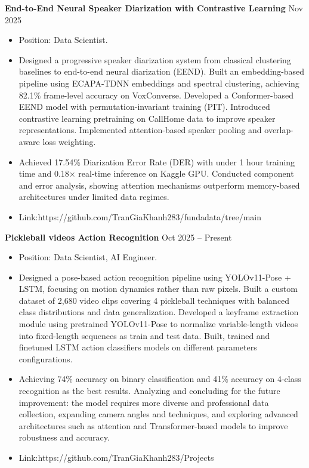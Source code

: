 \documentclass[11pt,a4paper]{article}
\begin{document}
\textbf{End-to-End Neural Speaker Diarization with Contrastive Learning} \hfill Nov 2025
\begin{itemize}[leftmargin=1.5em]
    \item Position: Data Scientist.
    \item Designed a progressive speaker diarization system from classical clustering baselines to end-to-end neural diarization (EEND). Built an embedding-based pipeline using ECAPA-TDNN embeddings and spectral clustering, achieving 82.1\% frame-level accuracy on VoxConverse. Developed a Conformer-based EEND model with permutation-invariant training (PIT). Introduced contrastive learning pretraining on CallHome data to improve speaker representations. Implemented attention-based speaker pooling and overlap-aware loss weighting.
    \item Achieved 17.54\% Diarization Error Rate (DER) with under 1 hour training time and 0.18× real-time inference on Kaggle GPU. Conducted component and error analysis, showing attention mechanisms outperform memory-based architectures under limited data regimes.
    \item Link:https://github.com/TranGiaKhanh283/fundadata/tree/main
\end{itemize}



\textbf{Pickleball videos Action Recognition} \hfill Oct 2025 -- Present
\begin{itemize}[leftmargin=1.5em]
    \item Position: Data Scientist, AI Engineer.
    \item Designed a pose-based action recognition pipeline using YOLOv11-Pose + LSTM, focusing on motion dynamics rather than raw pixels. Built a custom dataset of 2,680 video clips covering 4 pickleball techniques with balanced class distributions and data generalization. Developed a keyframe extraction module using pretrained YOLOv11-Pose to normalize variable-length videos into fixed-length sequences as train and test data. Built, trained and finetuned LSTM action classifiers models on different parameters configurations.
    \item Achieving 74\% accuracy on binary classification and 41\% accuracy on 4-class recognition as the best results. Analyzing and concluding for the future improvement: the model requires more diverse and professional data collection, expanding camera angles and techniques, and exploring advanced architectures such as attention and Transformer-based models to improve robustness and accuracy.
    \item Link:https://github.com/TranGiaKhanh283/Projects
\end{itemize}
\end{document}
